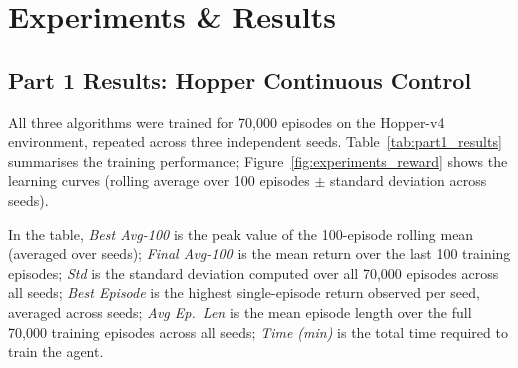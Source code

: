 \section{Experiments \& Results}

\subsection{Part 1 Results: Hopper Continuous Control}

All three algorithms were trained for 70{,}000 episodes on the Hopper-v4 environment, repeated across three independent seeds.
Table~\ref{tab:part1_results} summarises the training performance;
Figure~\ref{fig:experiments_reward} shows the learning curves (rolling average over 100 episodes $\pm$ standard deviation across seeds).

In the table, \emph{Best Avg-100} is the peak value of the 100-episode rolling mean (averaged over seeds);
\emph{Final Avg-100} is the mean return over the last 100 training episodes; \emph{Std} is the standard deviation computed over all 70{,}000 episodes across all seeds;
\emph{Best Episode} is the highest single-episode return observed per seed, averaged across seeds;
\emph{Avg Ep.\ Len} is the mean episode length over the full 70{,}000 training episodes across all seeds;
\emph{Time (min)} is the total time required to train the agent.



\begin{table}[ht]
\centering
\caption{training performance on Hopper-v4 (mean over 3 seeds).}
\label{tab:part1_results}
\end{table}

